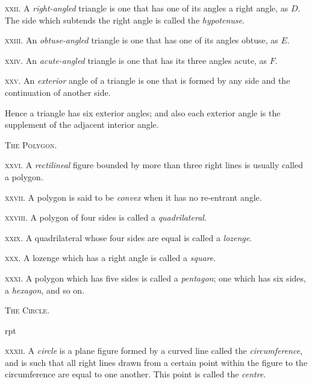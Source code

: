 \documentclass[oneside]{book}
\newcommand\imgflow[3]{
\setcounter{wrapwidth}{#1}
\begin{wrapfigure}[#2]{r}{\value{wrapwidth}pt}
\begin{center}
\vspace{-0.3in}
\end{center}
\end{wrapfigure}
}
\newcommand\imgcent[2]{
\begin{center}
\end{center}
}
\begin{document}
\imgcent{233}{f007}

\textsc{xxii}. A \textit{right-angled} triangle is one that has one of
its angles a right angle, as $D$. The side which subtends
the right angle is called the \textit{hypotenuse}.

\textsc{xxiii}. An \textit{obtuse-angled} triangle is one that has one
of its angles obtuse, as $E$.

\textsc{xxiv}. An \textit{acute-angled} triangle is one that has its three
angles acute, as $F$.

\imgcent{233}{f008}

\textsc{xxv}. An \textit{exterior} angle of a triangle is one that is
formed by any side and the continuation of another
side.

\begin{footnotesize}
Hence a triangle has six exterior angles; and also each exterior
angle is the supplement of the adjacent interior angle.
\par\end{footnotesize}


\begin{center}
\textsc{The Polygon.}
\end{center}

\textsc{xxvi}. A \textit{rectilineal} figure bounded by more than three
right lines is usually called a polygon.

\textsc{xxvii}. A polygon is said to be \textit{convex} when it has no
re-entrant angle.

\textsc{xxviii}. A polygon of four sides is called a \textit{quadrilateral}.

\textsc{xxix}. A quadrilateral whose four sides are equal is
called a \textit{lozenge}.

\textsc{xxx}. A lozenge which has a right angle is called a
\textit{square}.

\textsc{xxxi}. A polygon which has five sides is called a
\textit{pentagon}; one which has six sides, a \textit{hexagon}, and so on.


\begin{center}
\textsc{The Circle.}
\end{center}

\imgflow{95}{7}{f009}
\textsc{xxxii}. A \textit{circle} is a plane figure formed by a curved
line called the \textit{circumference}, and is
such that all right lines drawn
from a certain point within the
figure to the circumference are
equal to one another. This point
is called the \textit{centre}.
\end{document}
